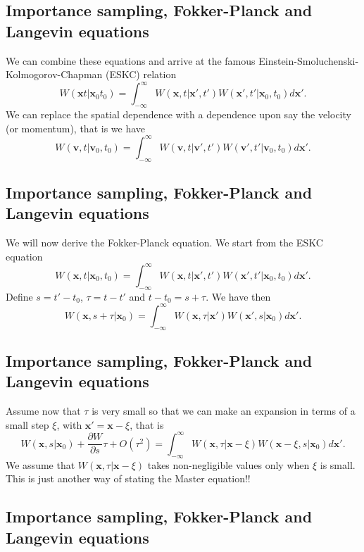 \documentclass[%
oneside,                 %
final,                   %
10pt]{article}
\begin{document}
\subsection{Importance sampling, Fokker-Planck and Langevin equations}

We can combine these equations and arrive at the famous Einstein-Smoluchenski-Kolmogorov-Chapman (ESKC) relation
\[
 W(\mathbf{x}t|\mathbf{x}_0t_0)  = \int_{-\infty}^{\infty} W(\mathbf{x},t|\mathbf{x}',t')W(\mathbf{x}',t'|\mathbf{x}_0,t_0)d\mathbf{x}'.
\]
We can replace the spatial dependence with a dependence upon say the velocity
(or momentum), that is we have
\[
 W(\mathbf{v},t|\mathbf{v}_0,t_0)  = \int_{-\infty}^{\infty} W(\mathbf{v},t|\mathbf{v}',t')W(\mathbf{v}',t'|\mathbf{v}_0,t_0)d\mathbf{x}'.
\]

\subsection{Importance sampling, Fokker-Planck and Langevin equations}

We will now derive the Fokker-Planck equation. 
We start from the ESKC equation
\[
 W(\mathbf{x},t|\mathbf{x}_0,t_0)  = \int_{-\infty}^{\infty} W(\mathbf{x},t|\mathbf{x}',t')W(\mathbf{x}',t'|\mathbf{x}_0,t_0)d\mathbf{x}'.
\]
Define $s=t'-t_0$, $\tau=t-t'$ and $t-t_0=s+\tau$. We have then
\[
 W(\mathbf{x},s+\tau|\mathbf{x}_0)  = \int_{-\infty}^{\infty} W(\mathbf{x},\tau|\mathbf{x}')W(\mathbf{x}',s|\mathbf{x}_0)d\mathbf{x}'.
\]

\subsection{Importance sampling, Fokker-Planck and Langevin equations}

Assume now that $\tau$ is very small so that we can make an expansion in terms of a small step $\xi$, with $\mathbf{x}'=\mathbf{x}-\xi$, that is
\[
 W(\mathbf{x},s|\mathbf{x}_0)+\frac{\partial W}{\partial s}\tau +O(\tau^2) = \int_{-\infty}^{\infty} W(\mathbf{x},\tau|\mathbf{x}-\xi)W(\mathbf{x}-\xi,s|\mathbf{x}_0)d\mathbf{x}'.
\]
We assume that $W(\mathbf{x},\tau|\mathbf{x}-\xi)$ takes non-negligible values only when $\xi$ is small. This is just another way of stating the Master equation!!

\subsection{Importance sampling, Fokker-Planck and Langevin equations}
\end{document}
